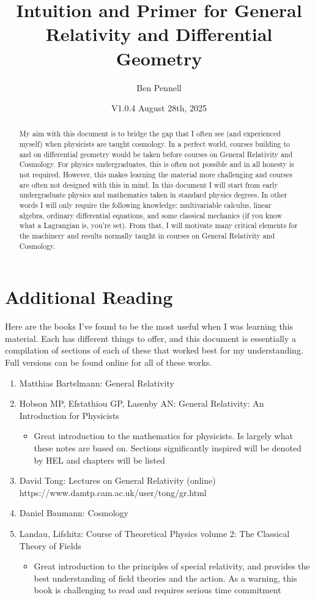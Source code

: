 \documentclass{article}
\title{Intuition and Primer for General Relativity and Differential Geometry}
\author{Ben Pennell}
\date{V1.0.4 August 28th, 2025}
\begin{document}
\maketitle

\begin{abstract}
My aim with this document is to bridge the gap that I often see (and experienced myself) when physicists are taught cosmology. In a perfect world, courses building to and on differential geometry would be taken before courses on General Relativity and Cosmology. For physics undergraduates, this is often not possible and in all honesty is not required. However, this makes learning the material more challenging and courses are often not designed with this in mind. In this document I will start from early undergraduate physics and mathematics taken in standard physics degrees. In other words I will only require the following knowledge: multivariable calculus, linear algebra, ordinary differential equations, and some classical mechanics (if you know what a Lagrangian is, you're set). From that, I will motivate many critical elements for the machinery and results normally taught in courses on General Relativity and Cosmology.

\end{abstract}

\tableofcontents

\section{Additional Reading}
Here are the books I've found to be the most useful when I was learning this material. Each has different things to offer, and this document is essentially a compilation of sections of each of these that worked best for my understanding. Full versions can be found online for all of these works.
\begin{enumerate}
    \item Matthias Bartelmann: General Relativity
    \item Hobson MP, Efstathiou GP, Lasenby AN: General Relativity: An Introduction for Physicists
    \begin{itemize}
        \item Great introduction to the mathematics for physicists. Is largely what these notes are based on. Sections significantly inspired will be denoted by HEL and chapters will be listed
    \end{itemize}
    \item David Tong: Lectures on General Relativity (online) https://www.damtp.cam.ac.uk/user/tong/gr.html
    \item Daniel Baumann: Cosmology
    \item Landau, Lifshitz: Course of Theoretical Physics volume 2: The Classical Theory of Fields
    \begin{itemize}
        \item Great introduction to the principles of special relativity, and provides the best understanding of field theories and the action. As a warning, this book is challenging to read and requires serious time commitment
    \end{itemize}
\end{enumerate}
\end{document}
